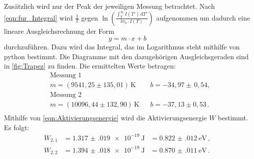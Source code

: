   \noindent
  Zusätzlich wird nur der Peak der jeweiligen Messung betrachtet.
  Nach \eqref{eqn:fur_Integral} wird $\frac{1}{T}$ gegen $\ln\left( \frac{\int_T^\infty I(T') \, \text{d}T'}{b \tau_0 \cdot I(T)}\right)$ aufgenommen um dadurch eine lineare Ausgleichsrechnung der Form
  \begin{equation*}
    y = m \cdot x + b 
  \end{equation*}
  durchzuführen.
  Dazu wird das Integral, das im Logarithmus steht mithilfe von python bestimmt.
  Die Diagramme mit den dazugehörigen Ausgleichsgeraden sind in \autoref{fig:Trapez} zu finden.
  Die ermittelten Werte betragen:
  \begin{align*}
    &\text{Messung 1} \\
    &m = (9541,25 \pm 135,01)\,\si{\kelvin} && b= -34,97 \pm  \, 0,54 , \\ 
    &\text{Messung 2} \\
    &m = (10096,44 \pm 132,90)\,\si{\kelvin} && b = -37,13 \pm 0,53\, . \\ %
  \end{align*}
  \noindent
  Mithilfe von \eqref{eqn:Aktivierungsenergie} wird die Aktivierungsenergie $W$ bestimmt.
  Es folgt:
  \begin{align*}
    W_{2,1} &= \SI{1.317(019)e-19}{\joule} &= \SI{0.822(012)}{\electronvolt} \, ,\\
    W_{2,2} &= \SI{1.394(018)e-19}{\joule} &= \SI{0.870(011)}{\electronvolt} \, .\\ %
  \end{align*}

